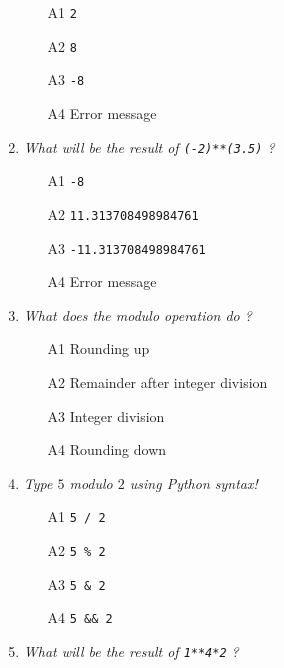 \begin{enumerate}
\begin{enumerate}
\item[A1] {\tt 2}
\item[A2] {\tt 8}
\item[A3] {\tt -8}
\item[A4] Error message
\end{enumerate}

\vspace{6mm}

\item {\em What will be the result of {\tt (-2)**(3.5)} ?}\\

\begin{enumerate}
\item[A1] {\tt -8}
\item[A2] {\tt 11.313708498984761}
\item[A3] {\tt -11.313708498984761}
\item[A4] Error message
\end{enumerate}

\vspace{6mm}

\item {\em What does the {\em modulo} operation do ?}\\

\begin{enumerate}
\item[A1] Rounding up
\item[A2] Remainder after integer division
\item[A3] Integer division
\item[A4] Rounding down
\end{enumerate}

\vspace{6mm}

\item {\em Type $5$ modulo $2$ using Python syntax!}\\

\begin{enumerate}
\item[A1] {\tt 5 / 2}
\item[A2] {\tt 5 \% 2}
\item[A3] {\tt 5 \& 2}
\item[A4] {\tt 5 \&\& 2}
\end{enumerate}

\vspace{6mm}

\item {\em What will be the result of {\tt 1**4*2} ?}\\


\end{enumerate}
